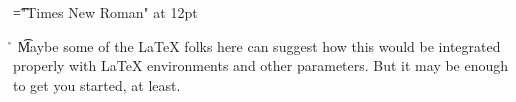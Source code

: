 \font\t="Times New Roman" at 12pt
 \r\n
\t{Maybe some of the LaTeX folks here can suggest how this would be integrated properly with LaTeX environments and other parameters. But it may be enough to get you started, at least. }


\bye
